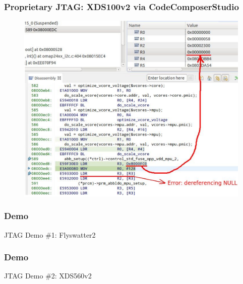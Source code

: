 \documentclass[aspectratio=169,usenames,dvipsnames]{beamer}
\newcounter{cont}
\begin{document}
\begin{frame}
  \frametitle{Proprietary JTAG: XDS100v2 via CodeComposerStudio}
  \begin{figure}
    \centering
    \includegraphics[scale=0.32]{images/uboot-jtag.png}
  \end{figure}
  \vspace*{-10mm}
\end{frame}


\begin{frame}[standout]
  \frametitle{Demo}
  JTAG Demo \#1: Flyswatter2
\end{frame}

\begin{frame}[standout]
  \frametitle{Demo}
  JTAG Demo \#2: XDS560v2
\end{frame}
\end{document}
